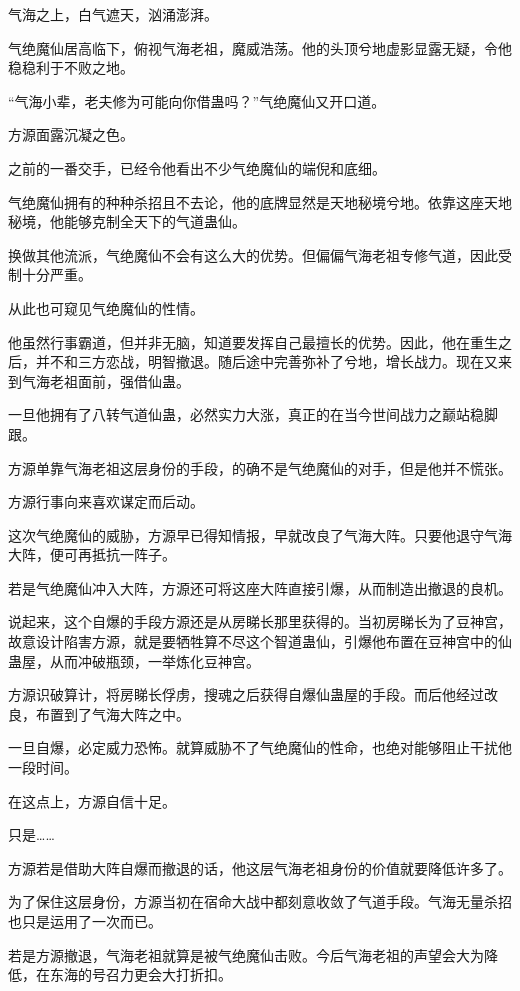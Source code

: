 
\begin{this_body}

气海之上，白气遮天，汹涌澎湃。

气绝魔仙居高临下，俯视气海老祖，魔威浩荡。他的头顶兮地虚影显露无疑，令他稳稳利于不败之地。

“气海小辈，老夫修为可能向你借蛊吗？”气绝魔仙又开口道。

方源面露沉凝之色。

之前的一番交手，已经令他看出不少气绝魔仙的端倪和底细。

气绝魔仙拥有的种种杀招且不去论，他的底牌显然是天地秘境兮地。依靠这座天地秘境，他能够克制全天下的气道蛊仙。

换做其他流派，气绝魔仙不会有这么大的优势。但偏偏气海老祖专修气道，因此受制十分严重。

从此也可窥见气绝魔仙的性情。

他虽然行事霸道，但并非无脑，知道要发挥自己最擅长的优势。因此，他在重生之后，并不和三方恋战，明智撤退。随后途中完善弥补了兮地，增长战力。现在又来到气海老祖面前，强借仙蛊。

一旦他拥有了八转气道仙蛊，必然实力大涨，真正的在当今世间战力之巅站稳脚跟。

方源单靠气海老祖这层身份的手段，的确不是气绝魔仙的对手，但是他并不慌张。

方源行事向来喜欢谋定而后动。

这次气绝魔仙的威胁，方源早已得知情报，早就改良了气海大阵。只要他退守气海大阵，便可再抵抗一阵子。

若是气绝魔仙冲入大阵，方源还可将这座大阵直接引爆，从而制造出撤退的良机。

说起来，这个自爆的手段方源还是从房睇长那里获得的。当初房睇长为了豆神宫，故意设计陷害方源，就是要牺牲算不尽这个智道蛊仙，引爆他布置在豆神宫中的仙蛊屋，从而冲破瓶颈，一举炼化豆神宫。

方源识破算计，将房睇长俘虏，搜魂之后获得自爆仙蛊屋的手段。而后他经过改良，布置到了气海大阵之中。

一旦自爆，必定威力恐怖。就算威胁不了气绝魔仙的性命，也绝对能够阻止干扰他一段时间。

在这点上，方源自信十足。

只是……

方源若是借助大阵自爆而撤退的话，他这层气海老祖身份的价值就要降低许多了。

为了保住这层身份，方源当初在宿命大战中都刻意收敛了气道手段。气海无量杀招也只是运用了一次而已。

若是方源撤退，气海老祖就算是被气绝魔仙击败。今后气海老祖的声望会大为降低，在东海的号召力更会大打折扣。


\end{this_body}
